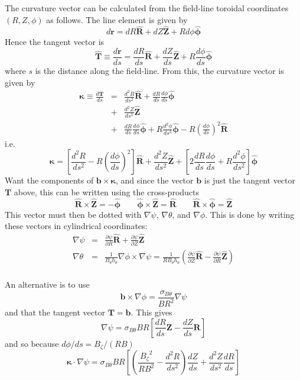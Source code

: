 \documentclass[12pt]{article}
\newcommand{\sbt}{\ensuremath{\sigma_{B\theta}}}
\newcommand{\dd}[2]{\ensuremath{\frac{d #1}{d #2}}}
\newcommand{\ddd}[2]{\ensuremath{\frac{d^2 #1}{d #2^2}}}
\newcommand{\deriv}[2]{\ensuremath{\frac{\partial #1}{\partial #2}}}
\newcommand{\hthe}{\ensuremath{h_\theta}}
\newcommand{\Bp}{\ensuremath{B_\theta}}
\newcommand{\Bt}{\ensuremath{B_\zeta}}
\newcommand{\Vec}[1]{\ensuremath{\mathbf{#1}}}
\newcommand{\bvec}{\Vec{b}}
\newcommand{\kvec}{\Vec{\kappa}}
\newcommand{\Rvec}{\ensuremath{\hat{\Vec{R}}}}
\newcommand{\Zvec}{\ensuremath{\hat{\Vec{Z}}}}
\newcommand{\phivec}{\ensuremath{\hat{\Vec{\phi}}}}
\begin{document}
The curvature vector can be calculated from the field-line toroidal
coordinates $\left(R,Z,\phi\right)$ as follows. The line element
is given by
\[
d\Vec{r} = dR\Rvec + dZ\Zvec + Rd\phi\phivec
\]
Hence the tangent vector is
\[
\hat{\Vec{T}} \equiv \dd{\Vec{r}}{s} = \dd{R}{s}\Rvec + \dd{Z}{s}\Zvec + R\dd{\phi}{s}\phivec
\]
where $s$ is the distance along the field-line. From this, the curvature vector
is given by
\begin{eqnarray*}
\kvec \equiv \dd{\Vec{T}}{s} &=& \ddd{R}{s}\Rvec + \dd{R}{s}\dd{\phi}{s}\phivec \\
&+& \ddd{Z}{s}\Zvec \\
&+& \dd{R}{s}\dd{\phi}{s}\phivec + R\ddd{\phi}{s}\phivec - R\left(\dd{\phi}{s}\right)^2 \Rvec
\end{eqnarray*}
i.e.
\begin{equation}
\kvec = \left[\ddd{R}{s} - R\left(\dd{\phi}{s}\right)^2\right]\Rvec + \ddd{Z}{s}\Zvec + \left[2\dd{R}{s}\dd{\phi}{s} + R\ddd{\phi}{s}\right]\phivec
\label{eq:kappaline}
\end{equation}
Want the components of $\Vec{b}\times\kvec$, and since the vector $\Vec{b}$
is just the tangent vector $\Vec{T}$ above, this can be written using the
cross-products
\[
\Rvec\times\Zvec = -\phivec \qquad \phivec\times\Zvec = \Rvec \qquad \Rvec\times\phivec = \Zvec
\]
This vector must then be dotted with $\nabla\psi$, $\nabla\theta$, and $\nabla\phi$. This is done by writing these vectors in cylindrical coordinates:
\begin{eqnarray*}
\nabla\psi &=& \deriv{\psi}{R}\hat{\Vec{R}} + \deriv{\psi}{Z}\hat{\Vec{Z}} \\
\nabla\theta &=& \frac{1}{\Bp\hthe}\nabla\phi\times\nabla\psi = \frac{1}{R\Bp\hthe}\left(\deriv{\psi}{Z}\hat{\Vec{R}} - \deriv{\psi}{R}\hat{\Vec{Z}}\right) \\
\end{eqnarray*}

An alternative is to use
\[
\bvec \times \nabla\phi = \frac{\sbt}{BR^2}\nabla\psi
\]
and that the tangent vector $\Vec{T} = \bvec$. This gives
\begin{equation}
\nabla\psi = \sbt BR\left[\frac{dR}{ds}\Vec{Z} - \frac{dZ}{ds}\Vec{R}\right] 
\label{eq:flinegradpsi}
\end{equation}
and so because $d\phi / ds = \Bt / \left(RB\right)$
\begin{equation}
\kvec\cdot\nabla\psi = \sbt BR\left[ \left( \frac{\Bt^2}{RB^2} - \ddd{R}{s}\right)\dd{Z}{s} + \ddd{Z}{s}\frac{dR}{ds} \right]
\label{eq:flinekappsi}
\end{equation}
\end{document}
